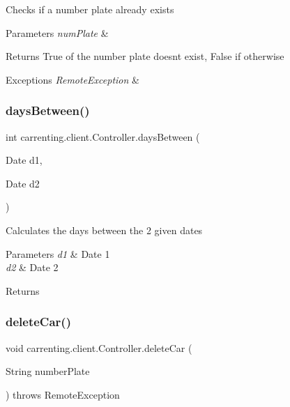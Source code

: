 Checks if a number plate already exists


\begin{DoxyParams}{Parameters}
{\em num\+Plate} & \\
\hline
\end{DoxyParams}
\begin{DoxyReturn}{Returns}
True of the number plate doesn\textquotesingle{}t exist, False if otherwise 
\end{DoxyReturn}

\begin{DoxyExceptions}{Exceptions}
{\em Remote\+Exception} & \\
\hline
\end{DoxyExceptions}
\mbox{\label{classcarrenting_1_1client_1_1_controller_adf3e50eccb845807f36a476e870717c8}} 
\subsubsection{\texorpdfstring{daysBetween()}{daysBetween()}}
{\footnotesize\ttfamily int carrenting.\+client.\+Controller.\+days\+Between (\begin{DoxyParamCaption}\item[{Date}]{d1,  }\item[{Date}]{d2 }\end{DoxyParamCaption})}

Calculates the days between the 2 given dates


\begin{DoxyParams}{Parameters}
{\em d1} & Date 1 \\
\hline
{\em d2} & Date 2 \\
\hline
\end{DoxyParams}
\begin{DoxyReturn}{Returns}

\end{DoxyReturn}
\mbox{\label{classcarrenting_1_1client_1_1_controller_acd2c7f2a6a74dd480004505b53d3a42e}} 
\subsubsection{\texorpdfstring{deleteCar()}{deleteCar()}}
{\footnotesize\ttfamily void carrenting.\+client.\+Controller.\+delete\+Car (\begin{DoxyParamCaption}\item[{String}]{number\+Plate }\end{DoxyParamCaption}) throws Remote\+Exception}

